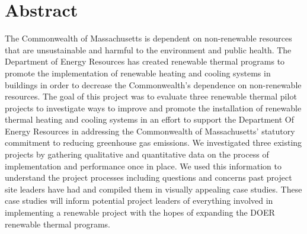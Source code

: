 \chapter*{Abstract}
%

The Commonwealth of Massachusetts is dependent on non-renewable resources that are unsustainable and harmful to the environment and public health. The Department of Energy Resources has created renewable thermal programs to promote the implementation of renewable heating and cooling systems in buildings in order to decrease the Commonwealth’s dependence on non-renewable resources. The goal of this project was to evaluate three renewable thermal pilot projects to investigate ways to improve and promote the installation of renewable thermal heating and cooling systems in an effort to support the Department Of Energy Resources in addressing the Commonwealth of Massachusetts’ statutory commitment to reducing greenhouse gas emissions. We investigated three existing projects by gathering qualitative and quantitative data on the process of implementation and performance once in place. We used this information to understand the project processes including questions and concerns past project site leaders have had and compiled them in visually appealing case studies. These case studies will inform potential project leaders of everything involved in implementing a renewable project with the hopes of expanding the DOER renewable thermal programs. 

